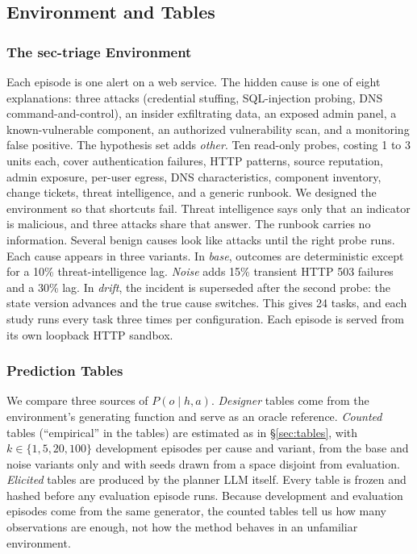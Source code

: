 \subsection{Environment and Tables}

\subsubsection{The sec-triage Environment} Each episode is one alert on a web service. The hidden cause is one of eight explanations: three attacks (credential stuffing, SQL-injection probing, DNS command-and-control), an insider exfiltrating data, an exposed admin panel, a known-vulnerable component, an authorized vulnerability scan, and a monitoring false positive. The hypothesis set adds \textit{other}. Ten read-only probes, costing 1 to 3 units each, cover authentication failures, HTTP patterns, source reputation, admin exposure, per-user egress, DNS characteristics, component inventory, change tickets, threat intelligence, and a generic runbook. We designed the environment so that shortcuts fail. Threat intelligence says only that an indicator is malicious, and three attacks share that answer. The runbook carries no information. Several benign causes look like attacks until the right probe runs. Each cause appears in three variants. In \textit{base}, outcomes are deterministic except for a 10\% threat-intelligence lag. \textit{Noise} adds 15\% transient HTTP 503 failures and a 30\% lag. In \textit{drift}, the incident is superseded after the second probe: the state version advances and the true cause switches. This gives 24 tasks, and each study runs every task three times per configuration. Each episode is served from its own loopback HTTP sandbox.

\subsubsection{Prediction Tables} We compare three sources of $P(o \mid h, a)$. \emph{Designer} tables come from the environment's generating function and serve as an oracle reference. \emph{Counted} tables (``empirical'' in the tables) are estimated as in \S\ref{sec:tables}, with $k \in \{1, 5, 20, 100\}$ development episodes per cause and variant, from the base and noise variants only and with seeds drawn from a space disjoint from evaluation. \emph{Elicited} tables are produced by the planner LLM itself. Every table is frozen and hashed before any evaluation episode runs. Because development and evaluation episodes come from the same generator, the counted tables tell us how many observations are enough, not how the method behaves in an unfamiliar environment.

